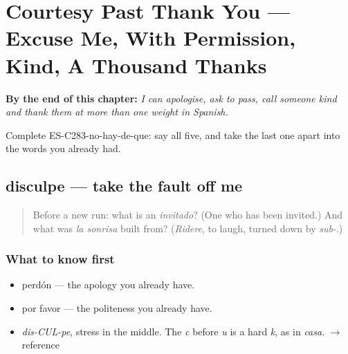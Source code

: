 
\chapter{Courtesy Past Thank You --- Excuse Me, With Permission, Kind, A Thousand Thanks}
\label{ch:cortesia}

\begin{chapteropening}
\textbf{By the end of this chapter:} \emph{I can apologise, ask to pass, call someone kind and thank them at more than one weight in Spanish.}

Complete ES-C283-no-hay-de-que: say all five, and take the last one apart into the words you already had.
\end{chapteropening}

\section[disculpe]{disculpe — take the fault off me}

\label{lesson:ES-C283-disculpe}



\begin{quote}
Before a new run: what is an \emph{invitado}? (One who has been invited.) And what was \emph{la sonrisa} built from? (\emph{Ridere}, to laugh, turned down by \emph{sub-}.)
\end{quote}

\subsection*{What to know first}
\begin{itemize}
\raggedright
  \item perdón — the apology you already have.
  \item por favor — the politeness you already have.
\end{itemize}

\begin{sounds}
\begin{itemize}
\raggedright
  \item \emph{dis-CUL-pe}, stress in the middle. The \emph{c} before \emph{u} is a hard \emph{k}, as in \emph{casa}. $\to$ reference
\end{itemize}
\end{sounds}

